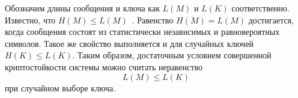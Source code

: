 







Обозначим длины сообщения и ключа как $L(M)$ и $L(K)$ соответственно. Известно, что $H(M) \leq L(M)$~\cite{GabPil:2007}. Равенство $H(M) = L(M)$ достигается, когда сообщения состоят из статистически независимых и равновероятных символов. Такое же свойство выполняется и для случайных ключей $H(K) \leq L(K)$. Таким образом, достаточным условием совершенной криптостойкости системы можно считать неравенство
 \[ L(M) \leq L(K)\]
при случайном выборе ключа.

